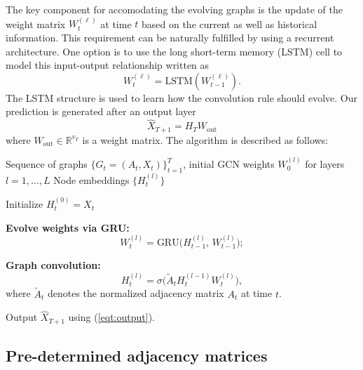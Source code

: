 \documentclass{article}
\begin{document}
\noindent The key component for accomodating the evolving graphs is the update of the
weight matrix $W^{(\ell)}_t$ at time $t$ based on the
current as well as
historical information. 
This requirement can be naturally fulfilled by using a recurrent architecture.
One option is to use the  long short-term memory (LSTM)
cell to model this input-output relationship
written as 
\[
W^{(\ell)}_t = \text{LSTM}(W^{(\ell)}_{t-1}).
\]
The LSTM structure is used
to learn how the convolution rule should evolve.
Our prediction is generated after an output layer
\begin{equation}\label{eqt:output}
    \hat{X}_{T+1} = H_T W_{\textrm{out}} 
\end{equation}
where $W_{\textrm{out}} \in \mathbb{R}^{v_{T}}$ is a 
weight matrix.
The algorithm is described as follows:

\begin{algorithm}[H]
\caption{EvolveGCN-H for Dynamic Graph Learning \citep{pareja2020evolvegcn}}
\label{alg:evolvegcnH}
\begin{algorithmic}[1]
\REQUIRE Sequence of graphs $\{G_t = (A_t, X_t)\}_{t=1}^T$, 
initial GCN weights $W_0^{(l)}$ for layers $l = 1, \dots, L$
\ENSURE Node embeddings $\{H_t^{(l)}\}$

    \STATE Initialize $H_t^{(0)} = X_t$
    
        \STATE \textbf{Evolve weights via GRU:}
        \[
        W_t^{(l)} = \text{GRU}\big(H_{t-1}^{(l)}, \, W_{t-1}^{(l)}\big);
        \]
        
        \STATE \textbf{Graph convolution:}
        \[
        H_t^{(l)} = \sigma\big(\tilde{A}_t H_t^{(l-1)} W_t^{(l)}\big),
        \]
        where $\tilde{A}_t$ denotes the normalized adjacency matrix $A_t$ at time $t$.
    \ENDFOR
\ENDFOR

\RETURN Output $\hat{X}_{T+1}$
using (\ref{eqt:output}).
\end{algorithmic}
\end{algorithm}


\subsection{Pre-determined adjacency matrices}
\end{document}
